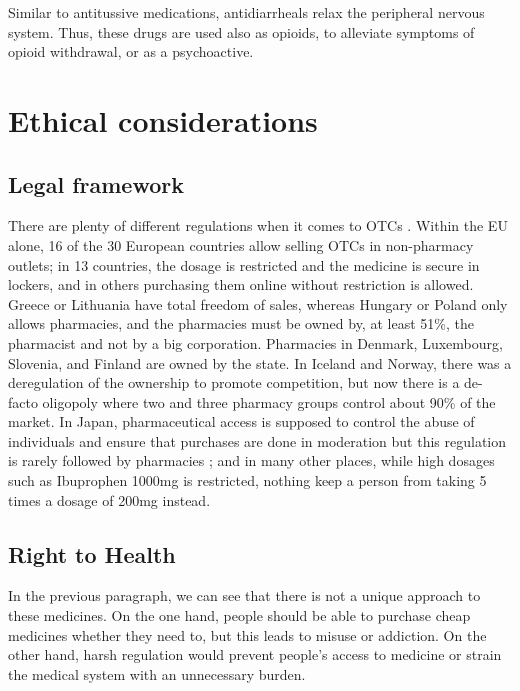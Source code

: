 Similar to antitussive medications, antidiarrheals relax the peripheral nervous system. Thus, these drugs are used also as opioids, to alleviate symptoms of opioid withdrawal, or as a psychoactive. \cite{otcAbuse2020}

\section{ Ethical considerations}

\subsection{ Legal framework }

There are plenty of different regulations when it comes to OTCs \cite{LpezVila2023}. Within the EU alone, 16 of the 30 European countries allow selling OTCs in non-pharmacy outlets; in 13 countries, the dosage is restricted and the medicine is secure in lockers, and in others purchasing them online without restriction is allowed. Greece or Lithuania have total freedom of sales, whereas Hungary or Poland only allows pharmacies, and the pharmacies must be owned by, at least 51\%, the pharmacist and not by a big corporation. Pharmacies in Denmark, Luxembourg, Slovenia, and Finland are owned by the state. In Iceland and Norway, there was a deregulation of the ownership to promote competition, but now there is a de-facto oligopoly where two and three pharmacy groups control about 90\% of the market. In Japan, pharmaceutical access is supposed to control the abuse of individuals and ensure that purchases are done in moderation but this regulation is rarely followed by pharmacies \cite{Ino2022}; and in many other places, while high dosages such as Ibuprophen 1000mg is restricted, nothing keep a person from taking 5 times a dosage of 200mg instead.

\subsection{ Right to Health }

In the previous paragraph, we can see that there is not a unique approach to these medicines. On the one hand, people should be able to purchase cheap medicines whether they need to, but this leads to misuse or addiction. On the other hand, harsh regulation would prevent people's access to medicine or strain the medical system with an unnecessary burden.


